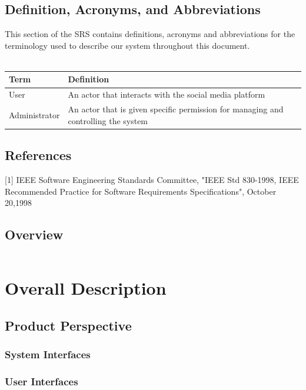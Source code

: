\documentclass[english]{article}
\begin{document}
		\subsection{Definition, Acronyms, and Abbreviations}
				This section of the SRS contains definitions, acronyms and abbreviations for the terminology used to describe our system throughout this document.
				\\
				\\
				\begin{tabular}{ |p{3cm}|p{9cm}|  }
				\hline
				\textbf{Term} & \textbf{Definition}\\
				\hline
				User & An actor that interacts with the social media platform\\
				\hline
				Administrator & An actor that is given specific permission for managing and controlling the system\\
				\hline
				\end{tabular}

		\subsection{References}
			[1] IEEE Software Engineering Standards Committee, "IEEE Std 830-1998, IEEE Recommended Practice for Software Requirements Specifications", October 20,1998

		\subsection{Overview}
				\begin{tabular}{ |p{3cm}||p{11cm}|  }

				\end{tabular}
	\newpage
	\section{Overall Description}
		
		\subsection{Product Perspective}
			
				\subsubsection{System Interfaces}
		

				\subsubsection{User Interfaces}
						
\end{document}
